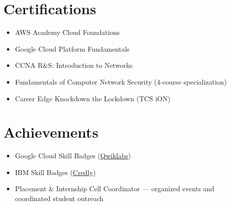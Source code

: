 \documentclass[11pt,a4paper]{article}
\begin{document}
\section*{Certifications}
\raggedcolumns%
\begin{multicols}{2}
\begin{itemize}[leftmargin=*, topsep=0pt, itemsep=0pt, parsep=0pt, partopsep=0pt]
    \item AWS Academy Cloud Foundations
    \item Google Cloud Platform Fundamentals
    \item CCNA R\&S: Introduction to Networks
    \columnbreak%
    \item Fundamentals of Computer Network Security (4-course special\-ization)
    \item Career Edge \textemdash{} Knockdown the Lockdown (TCS iON)
\end{itemize}
\end{multicols}

\section*{Achievements}
\raggedcolumns%
\begin{multicols}{2}
\begin{itemize}[leftmargin=*, topsep=0pt, itemsep=0pt, parsep=0pt, partopsep=0pt]
    \item Google Cloud Skill Badges (\href{https://www.cloudskillsboost.google/public_profiles/e4dd330f-6277-423a-b75d-1ba0dde516fc}{Qwiklabs})
    \item IBM Skill Badges (\href{https://www.credly.com/users/jaival-saija/badges#credly}{Credly})
    \columnbreak%
    \item Placement \& Internship Cell Coordinator — organized events and coordinated student outreach
\end{itemize}
\end{multicols}
\end{document}

